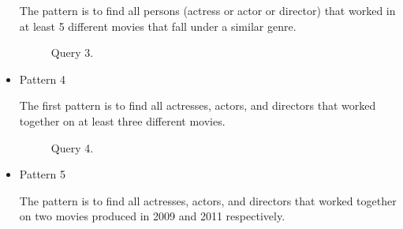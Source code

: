 \begin{itemize}
The pattern is to find all persons (actress or actor or director) that worked in at least 5 different movies that fall under a similar genre.


\begin{figure}[t]
\centering
{}
\caption{Query 3.}
\label{fig:query3}
\centering
\end{figure}

\item Pattern 4

The first pattern is to find all actresses, actors, and directors that worked together on at least three different movies.


\begin{figure}[t]
\centering
{}
\caption{Query 4.}
\label{fig:query4}
\centering
\end{figure}

\item Pattern 5

The pattern is to find all actresses, actors, and directors that worked together on two movies produced in 2009 and 2011 respectively.



\end{itemize}
